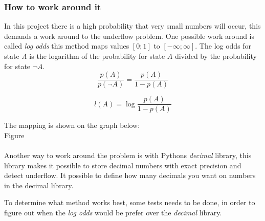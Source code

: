 \subsubsection{How to work around it}
In this project there is a high probability that very small numbers will occur, this demands a work around to the underflow problem. One possible work around is called \textit{log odds} this method maps values $[0;1]$ to $[-\infty; \infty]$. The log odds for state \textit{A} is the logarithm of the probability for state $A$ divided by the probability for state $\neg A$.\\

    $$\frac{p(A)}{p(\neg A)} = \frac{p(A)}{1-p(A)}$$

    $$l(A) = \log \frac{p(A)}{1-p(A)}$$

    The mapping is shown on the graph below:\\
Figure\\\\

    Another way to work around the problem is with Pythons \textit{decimal} library, this library makes it possible to store decimal numbers with exact precision and detect underflow. It possible to define how many decimals you want on numbers in the decimal library.

To determine what method works best, some tests needs to be done, in order to figure out when the \textit{log odds} would be prefer over the \textit{decimal} library.
